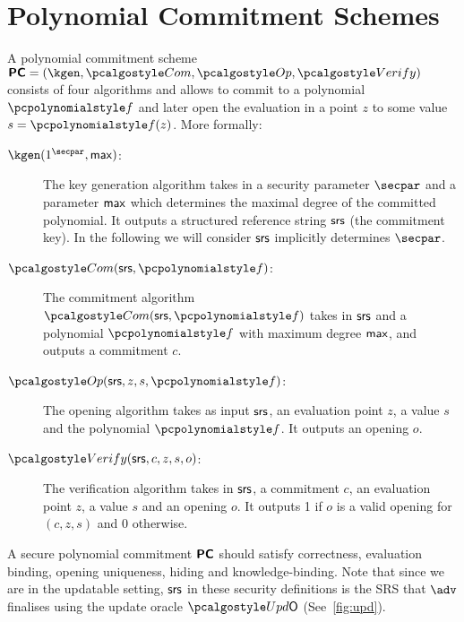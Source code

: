 
\section{Polynomial Commitment Schemes}
\label{sec:pcom}
A polynomial commitment scheme $\PCOM = (\kgen, \com, \open, \verify)$ consists of four
algorithms and allows to commit to a polynomial $\p{f}$ and later open the evaluation in a
point $z$ to some value $s=\p{f}(z)$. More formally:
\begin{description}
\item[$\kgen(1^\secpar, \maxdeg)$:] The key generation algorithm takes in a security
  parameter $\secpar$ and a parameter $\mathsf{max}$ which determines the maximal degree of the
  committed polynomial. It outputs a structured reference string $\mathsf{srs}$ (the commitment
  key). In the following we will consider $\mathsf{srs}$ implicitly determines $\secpar$.
\item[$\com(\srs, \p{f})$:] The commitment algorithm $\com(\srs, \p{f})$ takes
  in $\mathsf{srs}$ and a polynomial $\p{f}$ with maximum degree $\mathsf{max}$, and outputs
  a commitment $c$.
\item[$\open(\srs, z, s, \p{f})$:] The opening algorithm
  takes as input $\mathsf{srs}$, an evaluation point $z$, a
  value $s$ and the polynomial $\p{f}$. It outputs an opening $o$.
\item[$\verify(\srs, c, z, s, o)$:] The verification algorithm takes in $\mathsf{srs}$,
  a commitment $c$, an evaluation point $z$, a value $s$ and an opening $o$. It
  outputs 1 if $o$ is a valid opening for $(c, z, s)$ and 0 otherwise.
\end{description} 

A secure polynomial commitment $\bm{\mathsf{PC}}$ should satisfy correctness, evaluation binding,
opening uniqueness, hiding and knowledge-binding.  Note that since we are in the updatable
setting, $\mathsf{srs}$ in these security definitions is the SRS that $\advse$ finalises using the
update oracle $\initU$ (See~\cref{fig:upd}).

